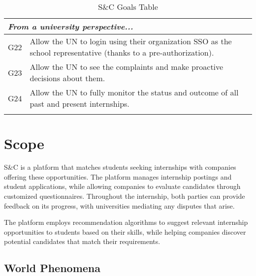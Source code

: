 \begin{longtable}{|l|p{}|}
    \hline \hline
    \multicolumn{2}{|l|}{\textit{From a university perspective...}}                                                                                                   \\
    \hline
    G22           & Allow the UN to login using their organization SSO as the school representative (thanks to a pre-authorization).                                  \\
    \hline
    G23           & Allow the UN to see the complaints and make proactive decisions about them.                                                                       \\
    \hline
    G24           & Allow the UN to fully monitor the status and outcome of all past and present internships.                                                         \\
    \hline
    \caption{S\&C Goals Table}
    \label{tab:goals}
\end{longtable}

\section{Scope}
\label{sec:scope}%

\par S\&C is a platform that matches students seeking internships with companies offering these opportunities. The
platform manages internship postings and student applications, while allowing companies to evaluate candidates through
customized questionnaires. Throughout the internship, both parties can provide feedback on its progress, with
universities mediating any disputes that arise.

\par The platform employs recommendation algorithms to suggest relevant internship opportunities to students based on
their skills, while helping companies discover potential candidates that match their requirements.

\subsection{World Phenomena}
\label{subsec:world-phenomena}%

